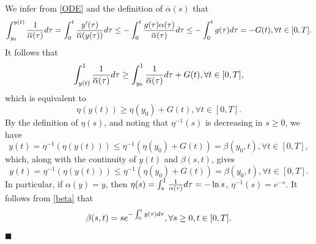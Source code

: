 \documentclass[10pt,a4paper]{amsart}
\newenvironment{proof}{{\it Proof:\enspace}}{\hfill $\blacksquare$\par}
\begin{document}
\begin{proof}
	
	We infer from \eqref{ODE} and the definition of $\overline{\alpha}(s)$ that
	\begin{align*}
		\int^{y(t)}_{y_0}\frac{1}{\overline{\alpha} (\tau)}{\rm d}\tau= \int^{t}_{0}\frac{y'(\tau)}{\overline{\alpha} (y(\tau))}{\rm d}\tau
		\leq - \int_0^t\frac{g (\tau) {\alpha} (\tau)} {\overline{\alpha} (\tau)} {\rm d}\tau
		\leq  - \int_0^t g (\tau) {\rm d}\tau
		= -G(t),\forall t\in[0,T].
	\end{align*}
	It follows that
	\begin{equation*}
		\int_{y(t)}^{1}\frac{1}{\overline{\alpha} (\tau)}{\rm d}\tau\geq \int_{y_0}^{1}\frac{1}{\overline{\alpha} (\tau)}{\rm d}\tau+G(t),\forall t\in [0,T],
	\end{equation*}
	which is equivalent to
	\begin{equation*}
		\eta(y(t))\geq \eta(y_0)+G(t),\forall t\in[0,T].
	\end{equation*}
	By the definition of $\eta(s)$, and noting that  $\eta^{-1}(s)$ is decreasing in $ s\geq 0$, we have
	\begin{equation*}
		y(t)=\eta^{-1}(\eta(y(t)))\leq \eta^{-1}(\eta(y_0)+G(t))= \beta (y_0,t),\forall t\in[0,T],
	\end{equation*}
	which, along with the continuity of $y(t)$ and $\beta(s,t)$, gives
	\begin{equation*}
		y(t)=\eta^{-1}(\eta(y(t)))\leq \eta^{-1}(\eta(y_0)+G(t))= \beta (y_0,t),\forall t\in [0,T] .
	\end{equation*}
	In particular, if $ \alpha(y)=y$,
	then $\eta(s)=\int_{s}^1\frac{1}{\alpha (\tau)}{\rm d}\tau=-\ln s$, $\eta^{-1}(s)=e^{-s}$.
	It follows from \eqref{beta} that
	\begin{equation*} \beta (s,t)=se^{-\int_{0}^tg (\tau){\rm d}\tau},\forall s\geq 0,t\in[0,T].\end{equation*}
\end{proof}
\end{document}

